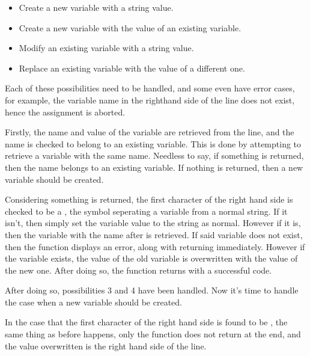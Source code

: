 \documentclass[12pt, a4paper]{report}
\begin{document}
                \begin{itemize}
                    \item Create a new variable with a string value.
                    \item Create a new variable with the value of an existing variable.
                    \item Modify an existing variable with a string value.
                    \item Replace an existing variable with the value of a different one.
                \end{itemize}

                Each of these possibilities need to be handled, and some even have
                error cases, for example, the variable name in the righthand side of the
                line does not exist, hence the assignment is aborted.

                Firstly, the name and value of the variable are retrieved from the line,
                and the name is checked to belong to an existing variable. This is done
                by attempting to retrieve a variable with the same name. Needless to say,
                if something is returned, then the name belongs to an existing variable.
                If nothing is returned, then a new variable should be created.

                Considering something is returned, the first character of the right hand
                side is checked to be a \tx{\$}, the symbol seperating a variable from
                a normal string. If it isn't, then simply set the variable value to 
                the string as normal. However if it is, then the variable with the name
                after \tx{\$} is retrieved. If said variable does not exist, then the 
                function displays an error, along with returning immediately. However if
                the variable exists, the value of the old variable is overwritten with 
                the value of the new one. After doing so, the function returns with 
                a successful code.

                After doing so, possibilities 3 and 4 have been handled. Now it's time
                to handle the case when a new variable should be created.

                In the case that the first character of the right hand side is found to
                be \tx{\$}, the same thing as before happens, only the function does not
                return at the end, and the value overwritten is the right hand side of the line.
\end{document}
